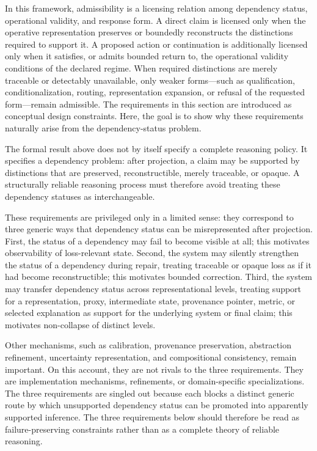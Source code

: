 \documentclass[11pt]{article}
\begin{document}
In this framework, admissibility is a licensing relation among dependency status, operational validity, and response form. A direct claim is licensed only when the operative representation preserves or boundedly reconstructs the distinctions required to support it. A proposed action or continuation is additionally licensed only when it satisfies, or admits bounded return to, the operational validity conditions of the declared regime. When required distinctions are merely traceable or detectably unavailable, only weaker forms---such as qualification, conditionalization, routing, representation expansion, or refusal of the requested form---remain admissible. The requirements in this section are introduced as conceptual design constraints. Here, the goal is to show why these requirements naturally arise from the dependency-status problem.

The formal result above does not by itself specify a complete reasoning policy. It specifies a dependency problem: after projection, a claim may be supported by distinctions that are preserved, reconstructible, merely traceable, or opaque. A structurally reliable reasoning process must therefore avoid treating these dependency statuses as interchangeable.

These requirements are privileged only in a limited sense: they correspond to three generic ways that dependency status can be misrepresented after projection. First, the status of a dependency may fail to become visible at all; this motivates observability of loss-relevant state. Second, the system may silently strengthen the status of a dependency during repair, treating traceable or opaque loss as if it had become reconstructible; this motivates bounded correction. Third, the system may transfer dependency status across representational levels, treating support for a representation, proxy, intermediate state, provenance pointer, metric, or selected explanation as support for the underlying system or final claim; this motivates non-collapse of distinct levels.

Other mechanisms, such as calibration, provenance preservation, abstraction refinement, uncertainty representation, and compositional consistency, remain important. On this account, they are not rivals to the three requirements. They are implementation mechanisms, refinements, or domain-specific specializations. The three requirements are singled out because each blocks a distinct generic route by which unsupported dependency status can be promoted into apparently supported inference. The three requirements below should therefore be read as failure-preserving constraints rather than as a complete theory of reliable reasoning.
\end{document}
